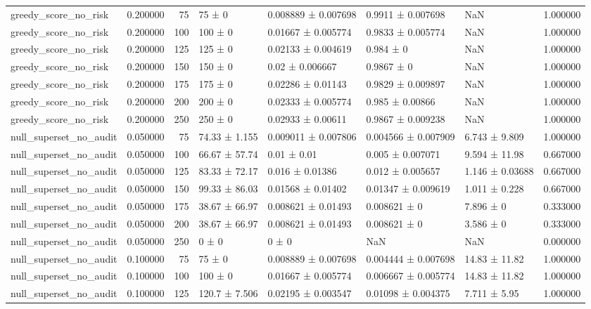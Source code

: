 \begin{tabular}{lrrllllr}
greedy_score_no_risk & 0.200000 & 75 & 75 ± 0 & 0.008889 ± 0.007698 & 0.9911 ± 0.007698 & NaN & 1.000000 \\
greedy_score_no_risk & 0.200000 & 100 & 100 ± 0 & 0.01667 ± 0.005774 & 0.9833 ± 0.005774 & NaN & 1.000000 \\
greedy_score_no_risk & 0.200000 & 125 & 125 ± 0 & 0.02133 ± 0.004619 & 0.984 ± 0 & NaN & 1.000000 \\
greedy_score_no_risk & 0.200000 & 150 & 150 ± 0 & 0.02 ± 0.006667 & 0.9867 ± 0 & NaN & 1.000000 \\
greedy_score_no_risk & 0.200000 & 175 & 175 ± 0 & 0.02286 ± 0.01143 & 0.9829 ± 0.009897 & NaN & 1.000000 \\
greedy_score_no_risk & 0.200000 & 200 & 200 ± 0 & 0.02333 ± 0.005774 & 0.985 ± 0.00866 & NaN & 1.000000 \\
greedy_score_no_risk & 0.200000 & 250 & 250 ± 0 & 0.02933 ± 0.00611 & 0.9867 ± 0.009238 & NaN & 1.000000 \\
null_superset_no_audit & 0.050000 & 75 & 74.33 ± 1.155 & 0.009011 ± 0.007806 & 0.004566 ± 0.007909 & 6.743 ± 9.809 & 1.000000 \\
null_superset_no_audit & 0.050000 & 100 & 66.67 ± 57.74 & 0.01 ± 0.01 & 0.005 ± 0.007071 & 9.594 ± 11.98 & 0.667000 \\
null_superset_no_audit & 0.050000 & 125 & 83.33 ± 72.17 & 0.016 ± 0.01386 & 0.012 ± 0.005657 & 1.146 ± 0.03688 & 0.667000 \\
null_superset_no_audit & 0.050000 & 150 & 99.33 ± 86.03 & 0.01568 ± 0.01402 & 0.01347 ± 0.009619 & 1.011 ± 0.228 & 0.667000 \\
null_superset_no_audit & 0.050000 & 175 & 38.67 ± 66.97 & 0.008621 ± 0.01493 & 0.008621 ± 0 & 7.896 ± 0 & 0.333000 \\
null_superset_no_audit & 0.050000 & 200 & 38.67 ± 66.97 & 0.008621 ± 0.01493 & 0.008621 ± 0 & 3.586 ± 0 & 0.333000 \\
null_superset_no_audit & 0.050000 & 250 & 0 ± 0 & 0 ± 0 & NaN & NaN & 0.000000 \\
null_superset_no_audit & 0.100000 & 75 & 75 ± 0 & 0.008889 ± 0.007698 & 0.004444 ± 0.007698 & 14.83 ± 11.82 & 1.000000 \\
null_superset_no_audit & 0.100000 & 100 & 100 ± 0 & 0.01667 ± 0.005774 & 0.006667 ± 0.005774 & 14.83 ± 11.82 & 1.000000 \\
null_superset_no_audit & 0.100000 & 125 & 120.7 ± 7.506 & 0.02195 ± 0.003547 & 0.01098 ± 0.004375 & 7.711 ± 5.95 & 1.000000 \\

\end{tabular}
